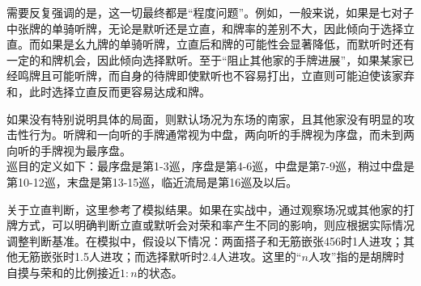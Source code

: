 需要反复强调的是，这一切最终都是“程度问题”。例如，一般来说，如果是七对子中张牌的单骑听牌，无论是默听还是立直，和牌率的差别不大，因此倾向于选择立直。而如果是幺九牌的单骑听牌，立直后和牌的可能性会显著降低，而默听时还有一定的和牌机会，因此倾向选择默听。至于“阻止其他家的手牌进展”，如果某家已经鸣牌且可能听牌，而自身的待牌即使默听也不容易打出，立直则可能迫使该家弃和，此时选择立直反而更容易达成和牌。

\vspace*{\fill}
\noindent\makebox[\linewidth]{\rule{\textwidth}{0.4pt}}

{\footnotesize 
如果没有特别说明具体的局面，则默认场况为东场的南家，且其他家没有明显的攻击性行为。听牌和一向听的手牌通常视为中盘，两向听的手牌视为序盘，而未到两向听的手牌视为最序盘。\\
巡目的定义如下：最序盘是第1-3巡，序盘是第4-6巡，中盘是第7-9巡，稍过中盘是第10-12巡，末盘是第13-15巡，临近流局是第16巡及以后。

关于立直判断，这里参考了模拟结果。如果在实战中，通过观察场况或其他家的打牌方式，可以明确判断立直或默听会对荣和率产生不同的影响，则应根据实际情况调整判断基准。在模拟中，假设以下情况：两面搭子和无筋嵌张456时1人进攻；其他无筋嵌张时1.5人进攻；而选择默听时2.4人进攻。这里的“$n$人攻”指的是胡牌时自摸与荣和的比例接近$1:n$的状态。}
